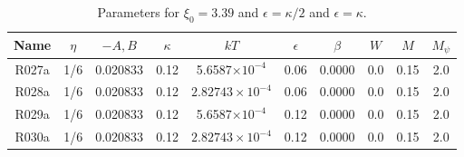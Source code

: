 \begin{table}[h]
\begin{center}
\begin{tabular}{|c|c|c|c|c|c|c|c|c|c|}
\hline
Name & $\eta$ & $-A,B$ & $\kappa$ & $kT$ & $\epsilon$ & $\beta$ & $W$
     & $M$ & $M_\psi$\\
\hline
R027a & 1/6 & 0.020833 & 0.12 & 5.6587$\times 10^{-4}$ & 0.06 & 0.0000 & 0.0 
      & 0.15 & 2.0 \\
\hline
R028a & 1/6 & 0.020833 & 0.12 & $2.82743\times 10^{-4}$ & 0.06 & 0.0000 & 0.0 
      & 0.15 & 2.0 \\
\hline
R029a & 1/6 & 0.020833 & 0.12 & 5.6587$\times 10^{-4}$ & 0.12 & 0.0000 & 0.0 
      & 0.15 & 2.0 \\
\hline
R030a & 1/6 & 0.020833 & 0.12 & $2.82743\times 10^{-4}$ & 0.12 & 0.0000 & 0.0 
      & 0.15 & 2.0 \\
\hline
\end{tabular}
\caption{Parameters for $\xi_0 = 3.39$ and $\epsilon = \kappa/2$ and
$\epsilon = \kappa$.}
\end{center}
\end{table}



